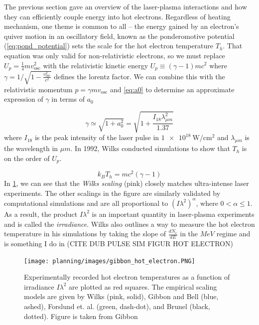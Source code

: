 The previous section gave an overview of the laser-plasma interactions and how they can efficiently couple energy into hot electrons. Regardless of heating mechanism, one theme is common to all -- the energy gained by an electron's quiver motion in an oscillatory field, known as the ponderomotive potential (\cref{eq:pond_potential}) sets the scale for the hot electron temperature $T_h$. That equation was only valid for non-relativistic electrons, so we must replace $U_p = \frac{1}{4} m v_\text{osc}^2$ with the relativistic kinetic energy $U_p \equiv (\gamma - 1) m c^2$ where $\gamma = 1 / \sqrt{1 - \frac{v_\text{osc}^2}{c^2}}$ defines the lorentz factor. We can combine this with the relativistic momentum $p = \gamma m v_\text{osc}$ and \cref{eq:a0} to determine an approximate expression of $\gamma$ in terms of $a_0$
	
\begin{equation}
	\gamma \simeq \sqrt{1 + a_0^2} = \sqrt{1 + \frac{I_{18} \lambda_{\mu m}^2}{1.37}} \label{eq:gamma}
\end{equation}
where $I_{18}$ is the peak intensity of the laser pulse in $\SI{1e18}{\watt \per \centi \meter \squared}$ and $\lambda_{\mu m}$ is the wavelength in $\mu m$. In 1992, Wilks \cite{Wilks_1992_PRL} conducted simulations to show that $T_h$ is on the order of $U_p$. 

\begin{equation}
	k_B T_h = m c^2 (\gamma - 1) \label{eq:wilks}
\end{equation}
In \cref{fig:electron_scaling}, we can see that the \emph{Wilks scaling} (pink) closely matches ultra-intense laser experiments. The other scalings in the figure are similarly validated by computational simulations and are all proportional to $(I \lambda^2)^\alpha$, where $0 < \alpha \leq 1$. As a result, the product $I \lambda^2$ is an important quantity in laser-plasma experiments and is called the \emph{irradiance}. Wilks also outlines a way to measure the hot electron temperature in his simulations \cite{Wilks_1992_PRL} by taking the slope of $\frac{dN_e}{dE}$ in the $MeV$ regime and is something I do in (CITE DUB PULSE SIM FIGUR HOT ELECTRON)

\begin{figure}
	\centering 
	\texttt{[image: planning/images/gibbon\_hot\_electron.PNG]}
	\caption{Experimentally recorded hot electron temperatures as a function of irradiance $I \lambda^2$ are plotted as red squares. The empirical scaling models are given by Wilks \cite{Wilks_1992_PRL}(pink, solid), Gibbon and Bell \cite{Gibbon_1992_PRL}(blue, ashed), Forslund et. al. \cite{Forslund_1977_PRL}(green, dash-dot), and Brunel \cite{Brunel_1987_PRL}(black, dotted). Figure is taken from Gibbon \cite{Gibbon_2005_Plasma}}
	\label{fig:electron_scaling}
\end{figure}

